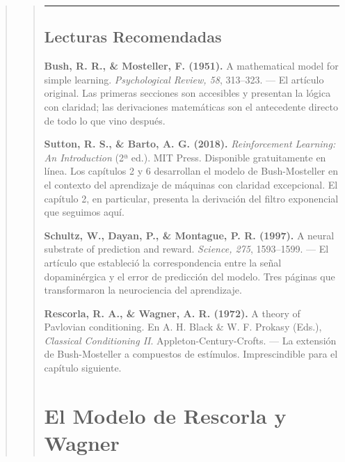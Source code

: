 \documentclass[
  letterpaper,
  DIV=11,
  numbers=noendperiod]{scrreprt}
\begin{document}
\begin{tcolorbox}[enhanced jigsaw, toprule=.15mm, arc=.35mm, colback=white, opacityback=0, colframe=quarto-callout-note-color-frame, breakable, rightrule=.15mm, left=2mm, leftrule=.75mm, bottomrule=.15mm]
\begin{quote}
\begin{quote}
\begin{center}\rule{0.5\linewidth}{0.5pt}\end{center}

\section{Lecturas Recomendadas}\label{lecturas-recomendadas-2}

\textbf{Bush, R. R., \& Mosteller, F. (1951).} A mathematical model for
simple learning. \emph{Psychological Review, 58}, 313--323. --- El
artículo original. Las primeras secciones son accesibles y presentan la
lógica con claridad; las derivaciones matemáticas son el antecedente
directo de todo lo que vino después.

\textbf{Sutton, R. S., \& Barto, A. G. (2018).} \emph{Reinforcement
Learning: An Introduction} (2ª ed.). MIT Press. Disponible gratuitamente
en línea. Los capítulos 2 y 6 desarrollan el modelo de Bush-Mosteller en
el contexto del aprendizaje de máquinas con claridad excepcional. El
capítulo 2, en particular, presenta la derivación del filtro exponencial
que seguimos aquí.

\textbf{Schultz, W., Dayan, P., \& Montague, P. R. (1997).} A neural
substrate of prediction and reward. \emph{Science, 275}, 1593--1599. ---
El artículo que estableció la correspondencia entre la señal
dopaminérgica y el error de predicción del modelo. Tres páginas que
transformaron la neurociencia del aprendizaje.

\textbf{Rescorla, R. A., \& Wagner, A. R. (1972).} A theory of Pavlovian
conditioning. En A. H. Black \& W. F. Prokasy (Eds.), \emph{Classical
Conditioning II}. Appleton-Century-Crofts. --- La extensión de
Bush-Mosteller a compuestos de estímulos. Imprescindible para el
capítulo siguiente.


\chapter{El Modelo de Rescorla y
Wagner}\label{el-modelo-de-rescorla-y-wagner}


\end{quote}
\end{quote}
\end{tcolorbox}
\end{document}

